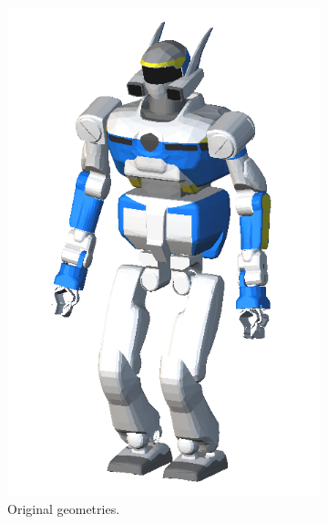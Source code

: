 \begin{figure}
  \centering
  \begin{subfigure}{0.24\columnwidth}
    \centering
    \includegraphics[width = \columnwidth]
                    {src/chap3-optimal-motion-planning/figure/hrp2-full-mesh.png}
    \caption{Original geometries.}
    \label{simple-patha}
  \end{subfigure}
  \begin{subfigure}{0.24\columnwidth}
    \centering

\end{subfigure}
\end{figure}
